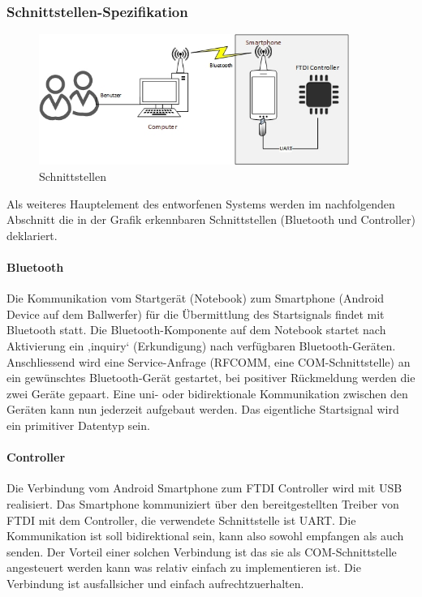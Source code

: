 	\subsubsection{Schnittstellen-Spezifikation}
		\begin{figure}[h!]
			\centering
			\includegraphics[width=0.9\textwidth]{Enddokumentation/Loesungskonzept/Bilder/Schnittstellen.jpg}
			\caption{Schnittstellen}		
		\end{figure}
		Als weiteres Hauptelement des entworfenen Systems werden im nachfolgenden Abschnitt die in der Grafik erkennbaren Schnittstellen (Bluetooth und Controller) deklariert.
		
		\paragraph{Bluetooth}
		Die Kommunikation vom Startgerät (Notebook) zum Smartphone (Android Device auf dem Ballwerfer) für die Übermittlung des Startsignals findet mit Bluetooth statt. Die Bluetooth-Komponente auf dem Notebook startet nach Aktivierung ein ‚inquiry‘ (Erkundigung) nach verfügbaren Bluetooth-Geräten. Anschliessend wird eine Service-Anfrage (RFCOMM, eine COM-Schnittstelle) an ein gewünschtes Bluetooth-Gerät gestartet, bei positiver Rückmeldung werden die zwei Geräte gepaart. Eine uni- oder bidirektionale Kommunikation zwischen den Geräten kann nun jederzeit aufgebaut werden. Das eigentliche Startsignal wird ein primitiver Datentyp sein.
		
		\paragraph{Controller}
		Die Verbindung vom Android Smartphone zum FTDI Controller wird mit USB realisiert. 
		Das Smartphone kommuniziert über den bereitgestellten Treiber von FTDI mit dem Controller, die verwendete Schnittstelle ist UART. Die Kommunikation ist soll bidirektional sein, kann also sowohl empfangen als auch senden. Der Vorteil einer solchen Verbindung ist das sie als COM-Schnittstelle angesteuert werden kann was relativ einfach zu implementieren ist. Die Verbindung ist ausfallsicher und einfach aufrechtzuerhalten.		
		
